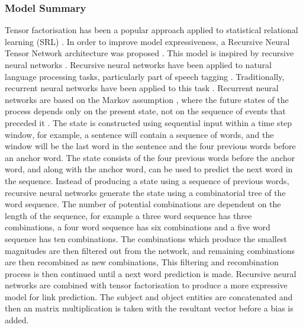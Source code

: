 \subsubsection{Model Summary} 
Tensor factorisation has been a popular approach applied to statistical relational learning (SRL) \cite{reference, reference, reference}. In order to improve model expressiveness, a Recursive Neural Tensor Network architecture was proposed \cite{reference}. This model is inspired by recursive neural networks \cite{reference}. Recursive neural networks have been applied to natural language processing tasks, particularly part of speech tagging \cite{reference}. Traditionally, recurrent neural networks have been applied to this task \cite{reference}. Recurrent neural networks are based on the Markov assumption \cite{reference}, where the future states of the process depends only on the present state, not on the sequence of events that preceded it \cite{reference}. The state is constructed using sequential input within a time step window, for example, a sentence will contain a sequence of words, and the window will be the last word in the sentence and the four previous words before an anchor word. The state consists of the four previous words before the anchor word, and along with the anchor word, can be used to predict the next word in the sequence.\newline
Instead of producing a state using a sequence of previous words, recursive neural networks generate the state using a combinatorial tree of the word sequence. The number of potential combinations are dependent on the length of the sequence, for example a three word sequence has three combinations, a four word sequence has six combinations and  a five word sequence has ten combinations. The combinations which produce the smallest magnitudes are then filtered out from the network, and remaining combinations are then recombined as new combinations, This filtering and recombination process is then continued until a next word prediction is made. \newline
Recursive neural networks are combined with tensor factorisation to produce a more expressive model for link prediction. The subject and object entities are concatenated and then an matrix multiplication is taken with the resultant vector before a bias is added. \newline
